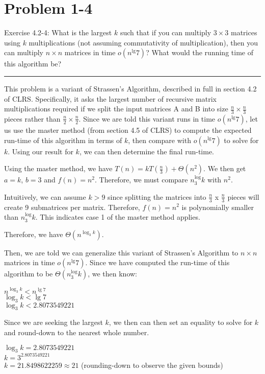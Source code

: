 \documentclass[11pt]{article}
\def\separateline{\medskip\hrule\medskip}
\begin{document}
\newpage

\section{Problem 1-4}
Exercise 4.2-4: What is the largest $k$ such that if you can multiply $3 \times 3$ matrices using $k$ multiplications (not assuming commutativity of multiplication), then you can multiply $n \times n$ matrices in time $o(n^\lg{7})$? What would the running time of this algorithm be?
\separateline

This problem is a variant of Strassen's Algorithm, described in full in section 4.2 of CLRS. Specifically, it asks the largest number of recursive matrix multiplications required if we split the input matrices A and B into size $\frac{n}{3} \times \frac{n}{3}$ pieces rather than $\frac{n}{2} \times \frac{n}{2}$. Since we are told this variant runs in time $o(n^\lg{7})$, let us use the master method (from section 4.5 of CLRS) to compute the expected run-time of this algorithm in terms of $k$, then compare with $o(n^\lg{7})$ to solve for $k$. Using our result for $k$, we can then determine the final run-time.

Using the master method, we have $T(n) = kT(\frac{n}{3}) + \Theta(n^2)$. We then get $a = k$, $b = 3$ and $f(n) = n^2$. Therefore, we must compare $n^\log_3{k}$ with $n^2$.

Intuitively, we can assume $k > 9$ since splitting the matrices into $\frac{n}{3}$ x $\frac{n}{3}$ pieces will create 9 submatrices per matrix. Therefore, $f(n) = n^2$ is polynomially smaller than $n^\log_3{k}$. This indicates case 1 of the master method applies.

Therefore, we have $\Theta(n^{\log_3{k}})$.

Then, we are told we can generalize this variant of Strassen's Algorithm to $n \times n$ matrices in time $o(n^\lg{7})$. Since we have computed the run-time of this algorithm to be $\Theta(n^\log_3{k})$, we then know:

$n^{\log_3{k}} < n^{\lg{7}}$ \\
$\log_3{k} < \lg{7}$ \\
$\log_3{k} < 2.8073549221$

Since we are seeking the largest $k$, we then can then set an equality to solve for $k$ and round-down to the nearest whole number.

$\log_3{k} = 2.8073549221$ \\
$k = 3^{2.8073549221}$ \\
$k = 21.8498622259 \approx 21$ (rounding-down to observe the given bounds) \\
\end{document}
